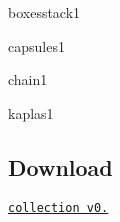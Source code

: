 
\begin{DoxyItemize}
\item boxesstack1  
\item capsules1  
\item chain1  
\item kaplas1  
\end{DoxyItemize}\hypertarget{problems_0_2_DownloadProblems}{}\subsection{Download}\label{problems_0_2_DownloadProblems}
\href{https://gforge.inria.fr/frs/download.php/33387/fclib-library-v0.2.tar.gz}{\tt collection v0.} 